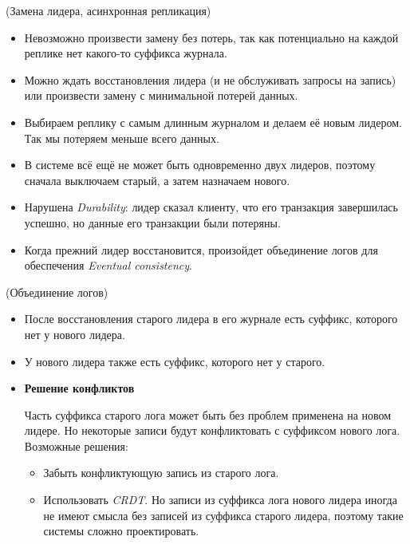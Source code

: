 \begin{algorithm}(Замена лидера, асинхронная репликация)
    \begin{itemize}
        \item Невозможно произвести замену без потерь, так как потенциально на каждой реплике нет какого-то суффикса журнала.
        \item Можно ждать восстановления лидера (и не обслуживать запросы на запись) или произвести замену с минимальной потерей данных.
        \item Выбираем реплику с самым длинным журналом и делаем её новым лидером. Так мы потеряем меньше всего данных.
        \item В системе всё ещё не может быть одновременно двух лидеров, поэтому сначала выключаем старый, а затем назначаем нового.
        \item Нарушена \textit{Durability}: лидер сказал клиенту, что его транзакция завершилась успешно, но данные его транзакции были потеряны.
        \item Когда прежний лидер восстановится, произойдет объединение логов для обеспечения \textit{Eventual consistency}.
    \end{itemize}

\end{algorithm}

\begin{algorithm}(Объединение логов)
    \begin{itemize}
        \item После восстановления старого лидера в его журнале есть суффикс, которого нет у нового лидера.
        \item У нового лидера также есть суффикс, которого нет у старого.

        \item \textbf{Решение конфликтов}

        Часть суффикса старого лога может быть без проблем применена на новом лидере. Но некоторые записи будут конфликтовать с суффиксом нового лога. Возможные решения:
        \begin{itemize}
            \item Забыть конфликтующую запись из старого лога.
            \item Использовать \textit{CRDT}. Но записи из суффикса лога нового лидера иногда не имеют смысла без записей из суффикса старого лидера, поэтому такие системы сложно проектировать.
        \end{itemize}

    \end{itemize}

\end{algorithm}

